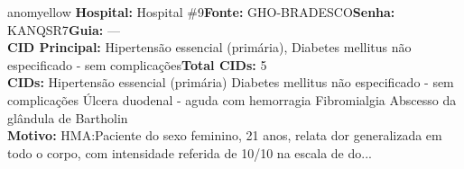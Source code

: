 \documentclass[a4paper,10pt]{article}
\begin{document}
\begin{anomalycard}[Interna\c{c}\~{a}o \#120527 | Pac. \#99903 | MODERADO (z=2.42) | LOS: 3d | 08/03/2026\,$\to$\,11/03/2026]{anomyellow}
\textbf{Hospital:} Hospital \#9\quad \textbf{Fonte:} GHO-BRADESCO\quad \textbf{Senha:} KANQSR7\quad \textbf{Guia:} ---\\

\textbf{CID Principal:} {\small Hipertensão essencial (primária), Diabetes mellitus não especificado - sem complicações}\quad\textbf{Total CIDs:} 5\\

\textbf{CIDs:} {\scriptsize Hipertensão essencial (primária) \textbar{} Diabetes mellitus não especificado - sem complicações \textbar{} Úlcera duodenal - aguda com hemorragia \textbar{} Fibromialgia \textbar{} Abscesso da glândula de Bartholin}\\

\textbf{Motivo:} {\scriptsize HMA:Paciente do sexo feminino, 21 anos, relata dor generalizada em todo o corpo, com intensidade referida de 10/10 na escala de do...}\\




\end{anomalycard}
\end{document}
